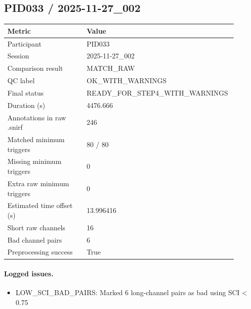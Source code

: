 \subsection*{PID033 / 2025-11-27\_002}
\begin{tabular}{p{0.34\linewidth}p{0.58\linewidth}}
\toprule
Metric & Value\\
\midrule
Participant & PID033\\
Session & 2025-11-27\_002\\
Comparison result & MATCH\_RAW\\
QC label & OK\_WITH\_WARNINGS\\
Final status & READY\_FOR\_STEP4\_WITH\_WARNINGS\\
Duration (s) & 4476.666\\
Annotations in raw .snirf & 246\\
Matched minimum triggers & 80 / 80\\
Missing minimum triggers & 0\\
Extra raw minimum triggers & 0\\
Estimated time offset (s) & 13.996416\\
Short raw channels & 16\\
Bad channel pairs & 6\\
Preprocessing success & True\\
\bottomrule
\end{tabular}
\paragraph{Logged issues.}
\begin{itemize}
\item [WARNING] LOW\_SCI\_BAD\_PAIRS: Marked 6 long-channel pairs as bad using SCI < 0.75
\end{itemize}
